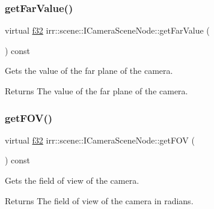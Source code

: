 \subsubsection{\texorpdfstring{get\+Far\+Value()}{getFarValue()}\hspace{0.1cm}{\footnotesize\ttfamily [2/2]}}
{\footnotesize\ttfamily virtual \hyperlink{namespaceirr_a0277be98d67dc26ff93b1a6a1d086b07}{f32} irr\+::scene\+::\+I\+Camera\+Scene\+Node\+::get\+Far\+Value (\begin{DoxyParamCaption}{ }\end{DoxyParamCaption}) const\hspace{0.3cm}{\ttfamily [pure virtual]}}



Gets the value of the far plane of the camera. 

\begin{DoxyReturn}{Returns}
The value of the far plane of the camera. 
\end{DoxyReturn}
\mbox{\label{classirr_1_1scene_1_1ICameraSceneNode_a8396148b1c3e27e79a615a859ae7d75d}} 
\subsubsection{\texorpdfstring{get\+F\+O\+V()}{getFOV()}\hspace{0.1cm}{\footnotesize\ttfamily [1/2]}}
{\footnotesize\ttfamily virtual \hyperlink{namespaceirr_a0277be98d67dc26ff93b1a6a1d086b07}{f32} irr\+::scene\+::\+I\+Camera\+Scene\+Node\+::get\+F\+OV (\begin{DoxyParamCaption}{ }\end{DoxyParamCaption}) const\hspace{0.3cm}{\ttfamily [pure virtual]}}



Gets the field of view of the camera. 

\begin{DoxyReturn}{Returns}
The field of view of the camera in radians. 
\end{DoxyReturn}
\mbox{\label{classirr_1_1scene_1_1ICameraSceneNode_a8396148b1c3e27e79a615a859ae7d75d}} 
